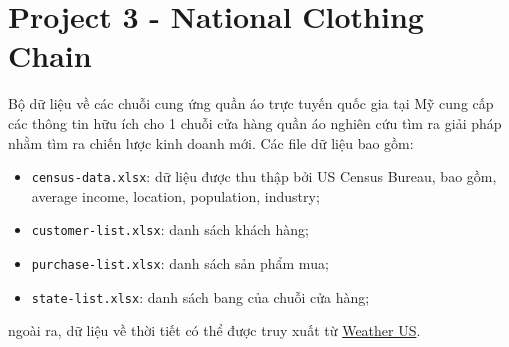 \documentclass[12pt]{article}
\theoremstyle{definition} \newtheorem{exercise}[theorem]{\bf Bài tập}
\begin{document}
\section*{Project 3 - National Clothing Chain}
Bộ dữ liệu về các chuỗi cung ứng quần áo trực tuyến quốc gia tại Mỹ cung cấp các thông tin hữu ích cho 1 chuỗi cửa hàng quần áo nghiên cứu tìm ra giải pháp nhằm tìm ra chiến lược kinh doanh mới. Các file dữ liệu bao gồm: 
\begin{itemize}
\item \texttt{census-data.xlsx}: dữ liệu được thu thập bởi US Census Bureau, bao gồm, average income, location, population, industry;
\item \texttt{customer-list.xlsx}: danh sách khách hàng;
\item \texttt{purchase-list.xlsx}: danh sách sản phẩm mua;
\item \texttt{state-list.xlsx}: danh sách bang của chuỗi cửa hàng;
\end{itemize}
ngoài ra, dữ liệu về thời tiết có thể được truy xuất từ \href{https://www.currentresults.com/Weather/US/average-annual-state-temperatures.php#:~:text=Average%20Annual%20Temperature%20for%20Each%20US%20State%20,%20%2030%20%2012%20more%20rows%20}{Weather US}.
\end{document}
